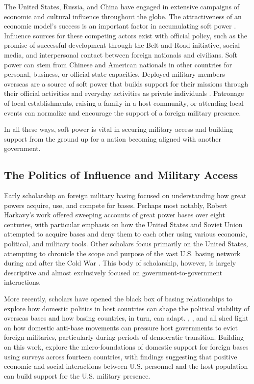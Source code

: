 The United States, Russia, and China have engaged in extensive campaigns of economic and cultural influence throughout the globe. The attractiveness of an economic model's success is an important factor in accumulating soft power \cite{mcclory2010}.  Influence sources for these competing actors exist with official policy, such as the promise of successful development through the Belt-and-Road initiative, social media, and interpersonal contact between foreign nationals and civilians. Soft power can stem from Chinese and American nationals in other countries for personal, business, or official state capacities. Deployed military members overseas are a source of soft power that builds support for their missions through their official activities and everyday activities as private individuals \cite{atkinson2014,allen2023}. Patronage of local establishments, raising a family in a host community, or attending local events can normalize and encourage the support of a foreign military presence. 

In all these ways, soft power is vital in securing military access and building support from the ground up for a nation becoming aligned with another government.


\subsection*{The Politics of Influence and Military Access} 

Early scholarship on foreign military basing focused on understanding how great powers acquire, use, and compete for bases. Perhaps most notably, Robert Harkavy's \citeyear{Harkavy1982,Harkavy1989,Harrison2000} work offered sweeping accounts of great power bases over eight centuries, with particular emphasis on how the United States and Soviet Union attempted to acquire bases and deny them to each other using various economic, political, and military tools. Other scholars focus primarily on the United States, attempting to chronicle the scope and purpose of the vast U.S. basing network during and after the Cold War \cite{vine2015,moore2016,sandars2000}. This body of scholarship, however, is largely descriptive and almost exclusively focused on government-to-government interactions.

More recently, scholars have opened the black box of basing relationships to explore how domestic politics in host countries can shape the political viability of overseas bases and how basing countries, in turn, can adapt. , , and  all shed light on how domestic anti-base movements can pressure host governments to evict foreign militaries, particularly during periods of democratic transition. Building on this work,  explore the micro-foundations of domestic support for foreign bases using surveys across fourteen countries, with findings suggesting that positive economic and social interactions between U.S. personnel and the host population can build support for the U.S. military presence.

